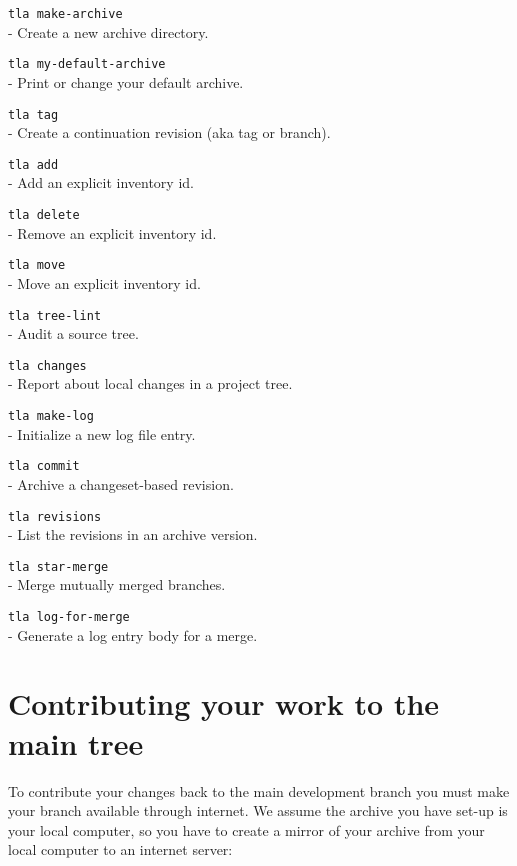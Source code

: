 \begin{table}
  \begin{api}
    {\tt tla make-archive}\\
    - Create a new archive directory.

    {\tt tla my-default-archive}\\
    - Print or change your default archive.

    {\tt tla tag}\\
    - Create a continuation revision (aka tag or branch).

    {\tt tla add}\\
    - Add an explicit inventory id.

    {\tt tla delete}\\
    - Remove an explicit inventory id.

    {\tt tla move}\\
    - Move an explicit inventory id.

    {\tt tla tree-lint}\\
    - Audit a source tree.

    {\tt tla changes}\\
    - Report about local changes in a project tree.

    {\tt tla make-log}\\
    - Initialize a new log file entry.

    {\tt tla commit}\\
    - Archive a changeset-based revision.

    {\tt tla revisions}\\
    - List the revisions in an archive version.

    {\tt tla star-merge}\\
    - Merge mutually merged branches.

    {\tt tla log-for-merge}\\
    - Generate a log entry body for a merge.
  \end{api}
  \caption{Maintaining private changes: summary}
  \label{Table: tla commands 2}
\end{table}



\section{Contributing your work to the main tree}

To contribute your changes back to the main development branch you must
make your branch available through internet. We assume the archive you
have set-up is your local computer, so you have to create a mirror of
your archive from your local computer to an internet server:

